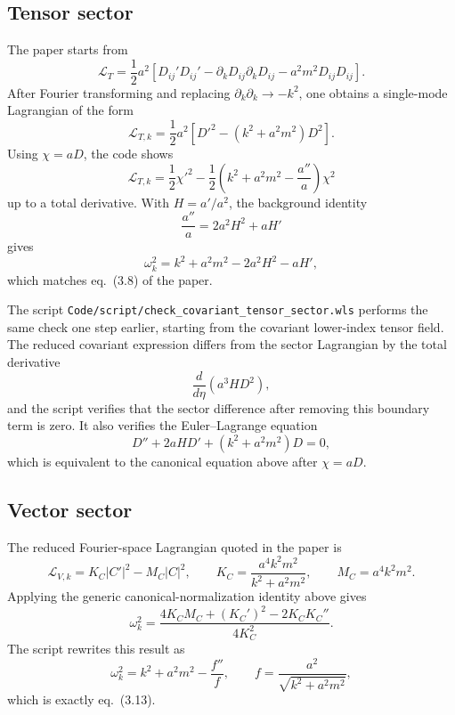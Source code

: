 \documentclass[11pt]{article}
\begin{document}
\subsection{Tensor sector}
The paper starts from
\begin{equation}
\mathcal{L}_T = \frac12 a^2 \left[ D_{ij}' D_{ij}' - \partial_k D_{ij}\partial_k D_{ij} - a^2 m^2 D_{ij}D_{ij}\right].
\end{equation}
After Fourier transforming and replacing $\partial_k \partial_k \to -k^2$, one obtains a single-mode Lagrangian of the form
\begin{equation}
\mathcal{L}_{T,k} = \frac12 a^2 \left[ D'^2 - (k^2 + a^2 m^2) D^2 \right].
\end{equation}
Using $\chi = aD$, the code shows
\begin{equation}
\mathcal{L}_{T,k} = \frac12 \chi'^2 - \frac12 \left(k^2 + a^2 m^2 - \frac{a''}{a}\right)\chi^2
\end{equation}
up to a total derivative. With $H = a'/a^2$, the background identity
\begin{equation}
\frac{a''}{a} = 2a^2 H^2 + aH'
\end{equation}
gives
\begin{equation}
\omega_k^2 = k^2 + a^2 m^2 - 2a^2 H^2 - aH',
\end{equation}
which matches eq.~(3.8) of the paper.

The script \texttt{Code/script/check\_covariant\_tensor\_sector.wls} performs the same check one step earlier, starting from the covariant lower-index tensor field. The reduced covariant expression differs from the sector Lagrangian by the total derivative
\begin{equation}
\frac{d}{d\eta}\left(a^3 H D^2\right),
\end{equation}
and the script verifies that the sector difference after removing this boundary term is zero. It also verifies the Euler--Lagrange equation
\begin{equation}
D'' + 2aH D' + (k^2+a^2m^2)D = 0,
\end{equation}
which is equivalent to the canonical equation above after $\chi=aD$.

\subsection{Vector sector}
The reduced Fourier-space Lagrangian quoted in the paper is
\begin{equation}
\mathcal{L}_{V,k} = K_C |C'|^2 - M_C |C|^2,
\qquad
K_C = \frac{a^4 k^2 m^2}{k^2 + a^2 m^2},
\qquad
M_C = a^4 k^2 m^2.
\end{equation}
Applying the generic canonical-normalization identity above gives
\begin{equation}
\omega_k^2 =
\frac{4K_C M_C + (K_C')^2 - 2 K_C K_C''}{4K_C^2}.
\end{equation}
The script rewrites this result as
\begin{equation}
\omega_k^2 = k^2 + a^2 m^2 - \frac{f''}{f},
\qquad
f = \frac{a^2}{\sqrt{k^2 + a^2 m^2}},
\end{equation}
which is exactly eq.~(3.13).
\end{document}
